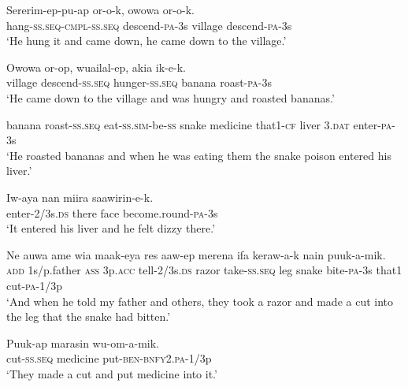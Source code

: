 {\ea\label{ex:a:x8}
\gll  Sererim-ep-pu-ap  or-o-k,  owowa  or-o-k. \\
hang-\textsc{ss.seq}-\textsc{cmpl}-\textsc{ss.seq}  descend-\textsc{pa}-3s  village  descend-\textsc{pa}-3s \\
\glt ‘He hung it and came down, he came down to the village.’ \\
\z


\ea\label{ex:a:x9}
\gll  Owowa  or-op,  wuailal-ep,  akia  ik-e-k. \\
village  descend-\textsc{ss.seq}  hunger-\textsc{ss.seq}  banana  roast-\textsc{pa}-3s \\
\glt ‘He came down to the village and was hungry and roasted bananas.’ \\
\z


\ea\label{ex:a:x10}
banana  roast-\textsc{ss.seq}  eat-\textsc{ss}.\textsc{sim}-be-\textsc{ss}  snake  medicine  that1-\textsc{cf}   liver  3.\textsc{dat}  enter-\textsc{pa}-3s \\


\glt ‘He roasted bananas and when he was eating them the snake poison entered his liver.’ \\
\z


\ea\label{ex:a:x11}
\gll  Iw-aya  nan  miira  saawirin-e-k. \\
enter-2/3s.\textsc{ds}  there  face  become.round-\textsc{pa}-3s \\
\glt ‘It entered his liver and he felt dizzy there.’ \\
\z


\ea\label{ex:a:x12}
\gll  Ne  auwa  ame  wia  maak-eya  res  aaw-ep                  merena  ifa  keraw-a-k  nain  puuk-a-mik. \\
\textsc{add}  1s/p.father  \textsc{ass}  3p.\textsc{acc}  tell-2/3s.\textsc{ds}  razor  take-\textsc{ss.seq}  leg  snake  bite-\textsc{pa}-3s  that1  cut-\textsc{pa}-1/3p \\


\glt ‘And when he told my father and others, they took a razor and made a cut into the leg that the snake had bitten.’ \\
\z


\ea\label{ex:a:x13}
\gll  Puuk-ap  marasin  wu-om-a-mik. \\
cut-\textsc{ss.seq}  medicine  put-\textsc{ben}-\textsc{bnfy}2.\textsc{pa}-1/3p \\
\glt ‘They made a cut and put medicine into it.’ \\
\z


}

